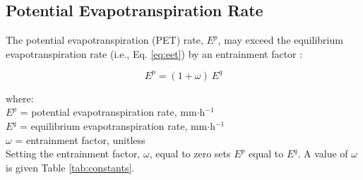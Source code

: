 \subsection{Potential Evapotranspiration Rate}
\label{sec:pet}
The potential evapotranspiration (PET) rate, $E^p$, may exceed the equilibrium evapotranspiration rate (i.e., Eq. \ref{eq:eet}) by an entrainment factor \parencite{lhomme97, priestley72}:

\begin{equation}
\label{eq:pet}
	E^p = \left(1 + \omega \right)\: E^q
\end{equation}

\noindent where:\\
\indent $E^p$ = potential evapotranspiration rate, mm$\cdot$h$^{-1}$\\
\indent $E^q$ = equilibrium evapotranspiration rate, mm$\cdot$h$^{-1}$\\
\indent $\omega$ = entrainment factor, unitless \\

\noindent Setting the entrainment factor, $\omega$, equal to zero sets $E^p$ equal to $E^q$. 
A value of $\omega$ is given Table \ref{tab:constants}.

